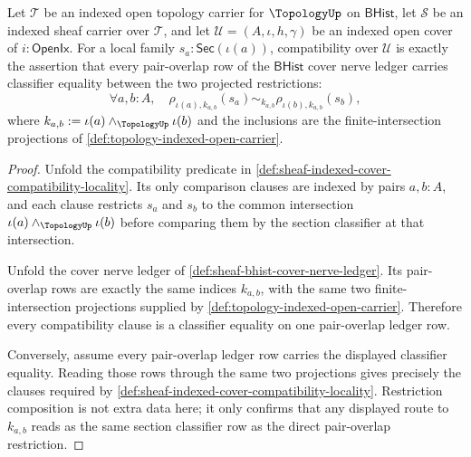 \begin{theorem}
\label{thm:sheaf-bhist-cover-nerve-overlap-projections}
Let $\mathcal{T}$ be an indexed open topology carrier for $\TopologyUp$ on $\mathsf{BHist}$, let $\mathcal{S}$ be an indexed sheaf carrier over $\mathcal{T}$, and let $\mathcal{U}=(A,\iota,h,\gamma)$ be an indexed open cover of $i:\mathsf{OpenIx}$. For a local family $s_a:\mathsf{Sec}(\iota(a))$, compatibility over $\mathcal{U}$ is exactly the assertion that every pair-overlap row of the $\mathsf{BHist}$ cover nerve ledger carries classifier equality between the two projected restrictions:
$$
\forall a,b:A,\quad
\rho_{\iota(a),k_{a,b}}(s_a)
\sim_{k_{a,b}}
\rho_{\iota(b),k_{a,b}}(s_b),
$$
where $k_{a,b}:=\iota(a)\wedge_{\TopologyUp}\iota(b)$ and the inclusions are the finite-intersection projections of \autoref{def:topology-indexed-open-carrier}.
\end{theorem}
\begin{proof}
Unfold the compatibility predicate in \autoref{def:sheaf-indexed-cover-compatibility-locality}. Its only comparison clauses are indexed by pairs $a,b:A$, and each clause restricts $s_a$ and $s_b$ to the common intersection $\iota(a)\wedge_{\TopologyUp}\iota(b)$ before comparing them by the section classifier at that intersection.

Unfold the cover nerve ledger of \autoref{def:sheaf-bhist-cover-nerve-ledger}. Its pair-overlap rows are exactly the same indices $k_{a,b}$, with the same two finite-intersection projections supplied by \autoref{def:topology-indexed-open-carrier}. Therefore every compatibility clause is a classifier equality on one pair-overlap ledger row.

Conversely, assume every pair-overlap ledger row carries the displayed classifier equality. Reading those rows through the same two projections gives precisely the clauses required by \autoref{def:sheaf-indexed-cover-compatibility-locality}. Restriction composition is not extra data here; it only confirms that any displayed route to $k_{a,b}$ reads as the same section classifier row as the direct pair-overlap restriction.
\end{proof}

